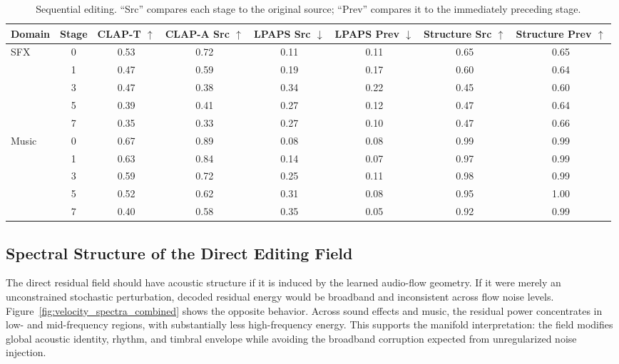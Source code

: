 \begin{table}[htpb]
    \centering
    \small
    \setlength{\tabcolsep}{4.5pt}
    \begin{tabular}{lccccccc}
        \toprule
        \textbf{Domain} & \textbf{Stage} & \textbf{CLAP-T} $\uparrow$ & \textbf{CLAP-A Src} $\uparrow$ & \textbf{LPAPS Src} $\downarrow$ & \textbf{LPAPS Prev} $\downarrow$ & \textbf{Structure Src} $\uparrow$ & \textbf{Structure Prev} $\uparrow$ \\
        \midrule
        \multirow{5}{*}{SFX} & 0 & 0.53 & 0.72 & 0.11 & 0.11 & 0.65 & 0.65 \\
        & 1 & 0.47 & 0.59 & 0.19 & 0.17 & 0.60 & 0.64 \\
        & 3 & 0.47 & 0.38 & 0.34 & 0.22 & 0.45 & 0.60 \\
        & 5 & 0.39 & 0.41 & 0.27 & 0.12 & 0.47 & 0.64 \\
        & 7 & 0.35 & 0.33 & 0.27 & 0.10 & 0.47 & 0.66 \\
        \midrule
        \multirow{5}{*}{Music} & 0 & 0.67 & 0.89 & 0.08 & 0.08 & 0.99 & 0.99 \\
        & 1 & 0.63 & 0.84 & 0.14 & 0.07 & 0.97 & 0.99 \\
        & 3 & 0.59 & 0.72 & 0.25 & 0.11 & 0.98 & 0.99 \\
        & 5 & 0.52 & 0.62 & 0.31 & 0.08 & 0.95 & 1.00 \\
        & 7 & 0.40 & 0.58 & 0.35 & 0.05 & 0.92 & 0.99 \\
        \bottomrule
    \end{tabular}
    \caption{Sequential editing. ``Src'' compares each stage to the original source; ``Prev'' compares it to the immediately preceding stage.}
    \label{tab:chained_app}
\end{table}

\subsection{Spectral Structure of the Direct Editing Field}
\label{app:velocity_spectra}

The direct residual field should have acoustic structure if it is induced by the learned audio-flow geometry.
If it were merely an unconstrained stochastic perturbation, decoded residual energy would be broadband and inconsistent across flow noise levels.
Figure~\ref{fig:velocity_spectra_combined} shows the opposite behavior.
Across sound effects and music, the residual power concentrates in low- and mid-frequency regions, with substantially less high-frequency energy.
This supports the manifold interpretation: the field modifies global acoustic identity, rhythm, and timbral envelope while avoiding the broadband corruption expected from unregularized noise injection.

